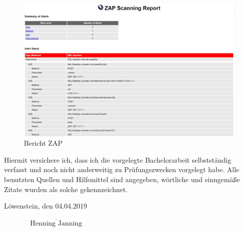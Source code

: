 \documentclass[12pt,oneside,a4paper,parskip,pointlessnumbers]{scrbook}
\def\BaAuthor{Henning Janning}
\def\BaDeadline{04.04.2019}
\begin{document}
  \begin{figure}[htb!]
    \centering
      \includegraphics[width=1\textwidth]{Images/ScrZAP}
    \caption[Bericht ZAP]{Bericht ZAP}
  \end{figure}


\backmatter


Hiermit versichere ich, dass ich die vorgelegte Bachelorarbeit selbstständig verfasst und noch nicht anderweitig zu Prüfungszwecken vorgelegt habe. Alle benutzten Quellen und Hilfsmittel sind angegeben, wörtliche und sinngemäße Zitate wurden als solche gekennzeichnet.

\vspace{20pt}
Löwenstein, den \BaDeadline
\begin{flushright}
$\overline{~~~~~~~~~~~~~~~~~\mbox{\BaAuthor}~~~~~~~~~~~~~~~~~}$
\end{flushright}
\end{document}
